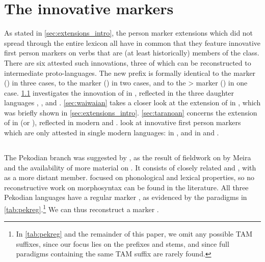 \section{The innovative  markers}
\label{sec:extensions}
As stated in \cref{sec:extensions_intro}, the person marker extensions which did not spread through the entire lexicon all have in common that they feature innovative first person markers on verbs that are (at least historically) members of the  class.
There are six attested such innovations, three of which can be reconstructed to intermediate proto-languages.
The new  prefix is formally identical to the  marker (\PC {}) in three cases, to the  marker (\PC {}) in two cases, and to the > marker (\PC {}) in one case.
\cref{sec:pekodian} investigates the innovation of  in \PPek, reflected in the three daughter languages \arara, \ikpeng, and \bakairi.
\cref{sec:waiwaian} takes a closer look at the extension of  in \PWai, which was briefly shown in \cref{sec:extensions_intro}.
\cref{sec:taranoan} concerns the extension of  in \PTir (or \PTar), reflected in modern \trio and \akuriyo.
 look at innovative first person markers which are only attested in single modern languages:
 in \akuriyo, and  in \carijo and \yukpa.
 
\subsection{\PPek {}}
\label{sec:pekodian}
The Pekodian branch was suggested by \textcite{meira2005southern}, as the result of fieldwork on \bakairi by Meira and the availability of more material on \ikpeng. %
It consists of closely related \arara and \ikpeng, with \bakairi as a more distant member.
\textcite{meira2005southern} focused on phonological and lexical properties, so no reconstructive work on \PPek morphosyntax can be found in the literature.
All three Pekodian languages have a regular  marker , as evidenced by the paradigms in \cref{tab:pekreg}.\footnote{In \cref{tab:pekreg} and the remainder of this paper, we omit any possible TAM suffixes, since our focus lies on the prefixes and stems, and since full paradigms containing the same TAM suffix are rarely found.}
We can thus reconstruct a \PPek {} marker .

